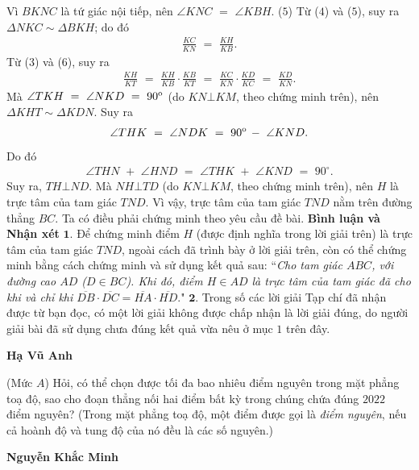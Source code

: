 \begin{multicols}{2}
	\vskip 0.05cm 
	Vì $BKNC$ là tứ giác nội tiếp, nên $\angle KNC\,\, = \,\,\angle KBH.$ \hfill ($5$)
	\vskip 0.05cm
	Từ ($4$) và ($5$), suy ra $\Delta NKC \sim \Delta BKH$; do đó
	\begin{align*}
		\frac{{KC}}{{KN}}\,\, = \,\,\frac{{KH}}{{KB}}. \tag{$6$}
	\end{align*}
	Từ ($3$) và ($6$), suy ra
	\begin{align*}
		\frac{{KH}}{{KT}}\,\, = \,\,\frac{{KH}}{{KB}} \cdot \frac{{KB}}{{KT}}\,\, = \,\,\frac{{KC}}{{KN}} \cdot \frac{{KD}}{{KC}}\,\, = \,\,\frac{{KD}}{{KN}}.
	\end{align*}
	Mà  $\angle TKH\,\, = \,\,\angle NKD\,\, = \,\,{90^{\rm{o}}}$ (do $KN \bot KM$, theo chứng minh trên), nên $\Delta KHT \sim  \Delta KDN$. Suy ra
	\begin{align*}
		\angle THK\,\, = \,\,\angle NDK\,\, = \,\,{90^{\rm{o}}}\, - \,\,\angle KND.
	\end{align*}
	Do đó
	\begin{align*}
		\angle THN\,\, + \,\,\angle HND\,\, = \,\,\angle THK\,\, + \,\,\angle KND\,\, = \,\,{90^\circ}.
	\end{align*}
	Suy ra, $TH \bot ND$. Mà $NH \bot TD$ (do $KN \bot KM$, theo chứng minh trên), nên $H$ là trực tâm của tam giác $TND$. Vì vậy, trực tâm của tam giác $TND$ nằm trên đường thẳng $BC$.
	\vskip 0.05cm
	Ta có điều phải chứng minh theo yêu cầu đề bài.
	\vskip 0.05cm
	\textbf{Bình luận và Nhận xét}
	\vskip 0.05cm
	$\pmb{1.}$ Để chứng minh điểm $H$ (được định nghĩa trong lời giải trên) là trực tâm của tam giác $TND$, ngoài cách đã trình bày ở lời giải trên, còn có thể chứng minh bằng cách chứng minh và sử dụng kết quả sau:
	\vskip 0.05cm
	``\textit{Cho tam giác $ABC$, với đường cao $AD$ ($D \in BC$). Khi đó, điểm $H \in AD$ là trực tâm của tam giác đã cho khi và chỉ khi  $\overline {DB}  \cdot \overline {DC}  = \overline {HA}  \cdot \overline {HD} .$}"
	\vskip 0.05cm
	$\pmb{2.}$ Trong số các lời giải Tạp chí đã nhận được từ bạn đọc, có một lời giải không được chấp nhận là lời giải đúng, do người giải bài đã sử dụng chưa đúng kết quả vừa nêu ở mục $1$ trên đây.
	\begin{flushright}
		\textbf{Hạ Vũ Anh}
	\end{flushright}
	{}
	(Mức $A$) Hỏi, có thể chọn được tối đa bao nhiêu điểm nguyên trong mặt phẳng toạ độ, sao cho đoạn thẳng nối hai điểm bất kỳ trong chúng chứa đúng $2022$ điểm nguyên?
	\vskip 0.05cm
	(Trong mặt phẳng toạ độ, một điểm được gọi là {\it điểm nguyên}, nếu cả hoành độ và tung độ của nó đều là các số nguyên.)
	\vskip 0.05cm
%	
	
	\begin{flushright}
		\textbf{Nguyễn Khắc Minh}
	\end{flushright}
	
\end{multicols}
